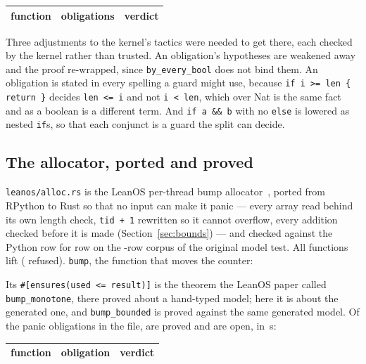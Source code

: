 \documentclass[11pt]{article}
\begin{document}
\begin{center}
\begin{tabular}{lrl}
\toprule
function & obligations & verdict \\
\midrule

\end{tabular}
\end{center}

Three adjustments to the kernel's tactics were needed to get there, each
checked by the kernel rather than trusted.  An obligation's hypotheses are
weakened away and the proof re-wrapped, since \texttt{by\_every\_bool}
does not bind them.  An obligation is stated in every spelling a guard
might use, because \texttt{if i >= len \{ return \}} decides
\texttt{len <= i} and not \texttt{i < len}, which over Nat is the same fact
and as a boolean is a different term.  And \texttt{if a \&\& b} with no
\texttt{else} is lowered as nested \texttt{if}s, so that each conjunct is a
guard the split can decide.

\subsection{The allocator, ported and proved}

\texttt{leanos/alloc.rs} is the LeanOS per-thread bump
allocator~\cite{hartshorn2026leanos}, ported from RPython to Rust so that
no input can make it panic --- every array read behind its own length
check, \texttt{tid + 1} rewritten so it cannot overflow, every addition
checked before it is made (Section~\ref{sec:bounds}) --- and checked
against the Python row for row on the \allocCorpusRows-row corpus of the
original model test.  All \allocFunctions{} functions lift
(\allocRefused{} refused).  \texttt{bump}, the function that moves the
counter:



Its \texttt{\#[ensures(used <= result)]} is the theorem the LeanOS paper
called \texttt{bump\_monotone}, there proved about a hand-typed model; here
it is \bumpMonotone{} about the generated one, and \texttt{bump\_bounded}
is proved against the same generated model.  Of
the \allocObligations{} panic obligations in the file, \allocProved{} are
proved and \allocOpen{} are open, in \allocSeconds{}\,s:

\begin{center}
\small
\begin{tabular}{lll}
\toprule
function & obligation & verdict \\
\midrule

\end{tabular}
\end{center}
\end{document}
